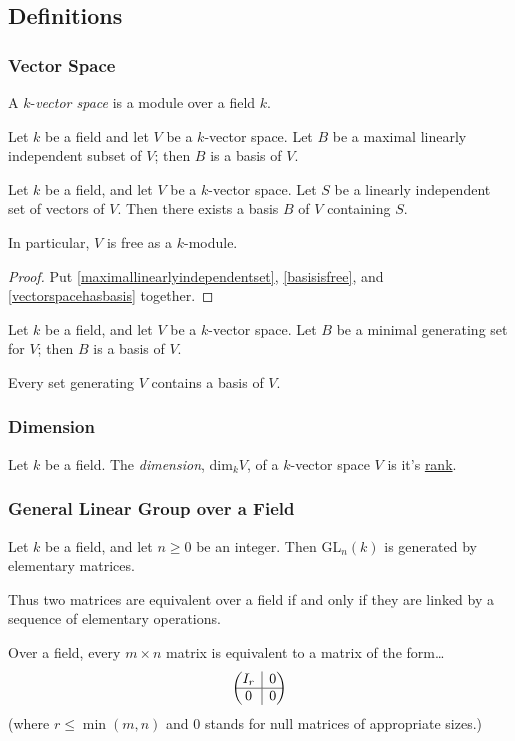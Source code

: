 \subsection{Definitions}

\subsubsection{Vector Space}\label{vectorspace}
A $k$-\emph{vector space} is a module over a field $k$.

\begin{lemma}
\label{vectorspacehasbasis}
Let $k$ be a field and let $V$ be a $k$-vector space. Let $B$ be a maximal linearly independent
subset of $V$; then $B$ is a basis of $V$.
\end{lemma}

\begin{proposition}
Let $k$ be a field, and let $V$ be a $k$-vector space. Let $S$ be a linearly independent set of vectors of $V$.
Then there exists a basis $B$ of $V$ containing $S$.

In particular, $V$ is free as a $k$-module.
\end{proposition}

\begin{proof}
Put \ref{maximallinearlyindependentset}, \ref{basisisfree}, and \ref{vectorspacehasbasis} together.
\end{proof}

\begin{lemma}
Let $k$ be a field, and let $V$ be a $k$-vector space. Let $B$ be a minimal generating set for $V$; then $B$ is a basis
of $V$.

Every set generating $V$ contains a basis of $V$.
\end{lemma}

\subsubsection{Dimension}\label{dimentions}
Let $k$ be a field. The \emph{dimension}, dim$_k V$, of a $k$-vector space $V$ is it's \hyperref[rank]{rank}.

\subsubsection{General Linear Group over a Field}

\begin{proposition}
Let $k$ be a field, and let $n \geq 0$ be an integer. Then GL$_n(k)$ is generated by elementary matrices.

Thus two matrices are equivalent over a field if and only if they are linked by a sequence of elementary operations.
\end{proposition}

\begin{proposition}
Over a field, every $m \times n$ matrix is equivalent to a matrix of the form\dots
\[
	\begin{pmatrix}
		I_r & \rvline & 0 \\
		\hline
		0 & \rvline & 0 \\
	\end{pmatrix}
\]
(where $r \leq \min(m,n)$ and $0$ stands for null matrices of appropriate sizes.)
\end{proposition}
